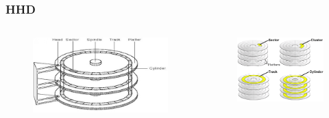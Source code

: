 \begin{frame}
	\frametitle{HHD}
	 

	\begin{columns}			
		\begin{figure}[!htbp]
			\centering 
			\includegraphics[width=1.0\linewidth]{images/5_memory/hhd_info_2.png}
		\end{figure}

		\begin{figure}[!htbp]
			\centering 
			\includegraphics[width=1.0\linewidth]{images/5_memory/hhd_info_3.png}
		\end{figure}
	\end{columns}
	
\end{frame}


